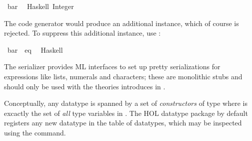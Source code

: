 \begin{isabellebody}
%
\endisatagproof
{\isafoldproof}%
%
\isadelimproof
%
\endisadelimproof
\isanewline
%
\isadelimtt
\isanewline
%
\endisadelimtt
%
\isatagtt
{}\isamarkupfalse%
\ bar\isanewline
\ \ {\isacharparenleft}Haskell\ {\isachardoublequoteopen}Integer{\isachardoublequoteclose}{\isacharparenright}%
\endisatagtt
{\isafoldtt}%
%
\isadelimtt
%
\endisadelimtt
%
\begin{isamarkuptext}%
The code generator would produce
  an additional instance, which of course is rejected.
  To suppress this additional instance, use
  \isa{{\isasymCODEINSTANCE}}:%
\end{isamarkuptext}%
\isamarkuptrue%
%
\isadelimtt
%
\endisadelimtt
%
\isatagtt
{}\isamarkupfalse%
\ bar\ {\isacharcolon}{\isacharcolon}\ eq\isanewline
\ \ {\isacharparenleft}Haskell\ {\isacharminus}{\isacharparenright}%
\endisatagtt
{\isafoldtt}%
%
\isadelimtt
%
\endisadelimtt
%
\isamarkuptrue%
%
\begin{isamarkuptext}%
The serializer provides ML interfaces to set up
  pretty serializations for expressions like lists, numerals
  and characters;  these are
  monolithic stubs and should only be used with the
  theories introduces in .%
\end{isamarkuptext}%
\isamarkuptrue%
%
\isamarkuptrue%
%
\begin{isamarkuptext}%
Conceptually, any datatype is spanned by a set of
  \emph{constructors} of type 
  where  is excactly the set of \emph{all}
  type variables in \isa{{\isasymtau}}.  The HOL datatype package
  by default registers any new datatype in the table
  of datatypes, which may be inspected using
  the \isa{{\isasymPRINTCODESETUP}} command.


\end{isamarkuptext}
\end{isabellebody}

